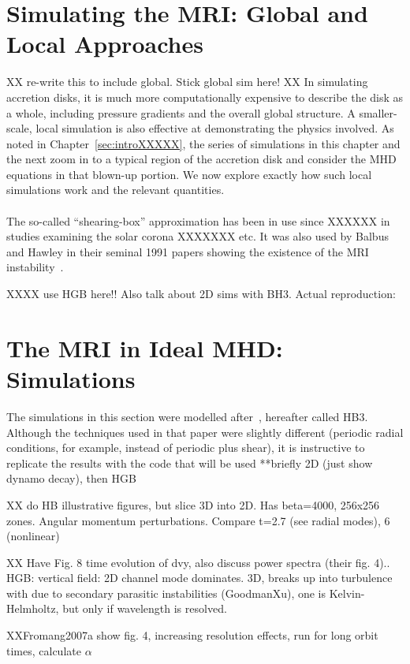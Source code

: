 \section{Simulating the MRI: Global and Local Approaches} \label{sec:mrisbideal}
XX re-write this to include global. Stick global sim here! XX
In simulating accretion disks, it is much more computationally expensive to describe the disk as a whole, including pressure gradients and the overall global structure. A smaller-scale, local simulation is also effective at demonstrating the physics involved. As noted in Chapter~\ref{sec:introXXXXX}, the series of simulations in this chapter and the next zoom in to a typical region of the accretion disk and consider the MHD equations in that blown-up portion. We now explore exactly how such local simulations work and the relevant quantities.\\
\\
The so-called ``shearing-box'' approximation has been in use since XXXXXX in studies examining the solar corona XXXXXXX etc. It was also used by Balbus and Hawley in their seminal 1991 papers showing the existence of the MRI instability~\cite{BH1991a, BH1991b, BH1991c}. 


XXXX use HGB here!! Also talk about 2D sims with BH3. Actual reproduction: 

\section{The MRI in Ideal MHD: Simulations} \label{sec:mrisimideal}
The simulations in this section were modelled after~\cite{XXXXXXBH1991c}, hereafter called HB3. Although the techniques used in that paper were slightly different (periodic radial conditions, for example, instead of periodic plus shear), it is instructive to replicate the results with the code that will be used
**briefly 2D (just show dynamo decay), then HGB

XX do HB illustrative figures, but slice 3D into 2D. Has beta=4000, 256x256 zones. Angular momentum perturbations. Compare t=2.7 (see radial modes), 6 (nonlinear) 

XX Have Fig. 8 time evolution of dvy, also discuss power spectra (their fig. 4)..
HGB: vertical field: 2D channel mode dominates. 3D, breaks up into turbulence with due to secondary parasitic instabilities (GoodmanXu), one is Kelvin-Helmholtz, but only if wavelength is resolved.

XXFromang2007a show fig. 4, increasing resolution effects, run for long orbit times, calculate $\alpha$

